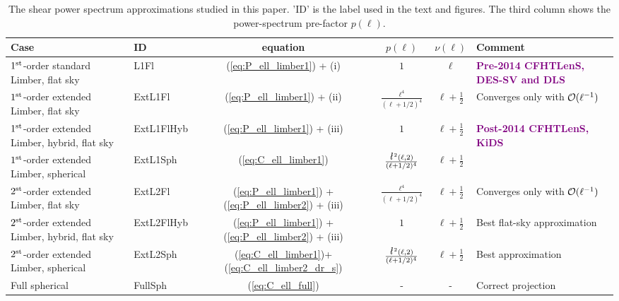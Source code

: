 \documentclass[fleqn,usenatbib]{mnras} %
\newcommand{\ellbar}{\hbox{\it \l}\,}
\newcommand{\ch}[1]{\textcolor{purple}{\textbf{#1}}}
\begin{document}
\renewcommand{\baselinestretch}{1.5}
\begin{table}
\begin{centering}
  \caption{\label{tab:cases}The shear power spectrum approximations studied in this paper. 'ID' is the label
    used in the text and figures.
    The third column shows the power-spectrum pre-factor $p(\ell)$. } 
    \begin{tabular}{|l|l|c|c|c|p{}}
  \hline
  Case & ID & equation & $p(\ell)$ & $\nu(\ell)$ & Comment \\ \hline
  $1^{\rm st}$-order standard Limber, flat sky & L1Fl & (\ref{eq:P_ell_limber1}) + (i)
    & $1$ & $\ell$ & \ch{Pre-2014 CFHTLenS, DES-SV and DLS} \\ \hline
  $1^{\rm st}$-order extended Limber, flat sky & ExtL1Fl & (\ref{eq:P_ell_limber1}) + (ii)
    & $\frac{\ell^4}{(\ell+1/2)^4}$ & $\ell + \frac 1 2$ & Converges only with ${\cal O}(\ell^{-1})$ \\ \hline
  $1^{\rm st}$-order extended Limber, hybrid, flat sky & ExtL1FlHyb & (\ref{eq:P_ell_limber1}) + (iii)
    & $1$ & $\ell + \frac 1 2$ & \ch{Post-2014 CFHTLenS, KiDS} \\ \hline
  $1^{\rm st}$-order extended Limber, spherical & ExtL1Sph & (\ref{eq:C_ell_limber1})
    & $\frac{\ellbar^2(\ell, 2)}{(\ell+1/2)^4}$ & $\ell+ \frac 1 2$ & \\ \hline
  $2^{\rm st}$-order extended Limber, flat sky & ExtL2Fl &  (\ref{eq:P_ell_limber1}) + (\ref{eq:P_ell_limber2}) + (iii)
    & $\frac{\ell^4}{(\ell+1/2)^4}$ 
    & $\ell+\frac 1 2$ & Converges only with ${\cal O}(\ell^{-1})$ \\ \hline
  $2^{\rm st}$-order extended Limber, hybrid, flat sky & ExtL2FlHyb &  (\ref{eq:P_ell_limber1}) + (\ref{eq:P_ell_limber2}) + (iii)
    & $1$ 
    & $\ell+ \frac 1 2$ & Best flat-sky approximation \\ \hline
  $2^{\rm st}$-order extended Limber, spherical & ExtL2Sph & (\ref{eq:C_ell_limber1})+(\ref{eq:C_ell_limber2_dr_s})
    & $\frac{\ellbar^2(\ell, 2)}{(\ell+1/2)^4}$ & $\ell+\frac 1 2$ & Best approximation \\ \hline
  Full spherical & FullSph & (\ref{eq:C_ell_full}) &
      - & - & Correct projection \\ \hline
  \end{tabular}

\end{centering}
\end{table}
\renewcommand{\baselinestretch}{1}
\end{document}
